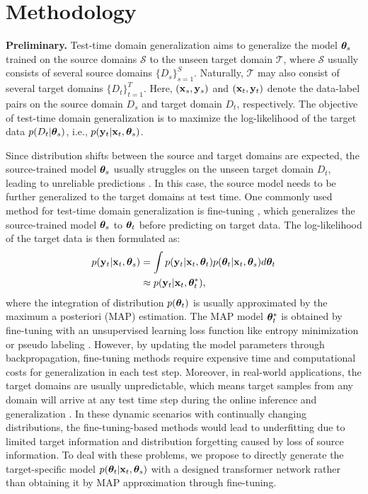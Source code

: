 
\section{Methodology}

\noindent
\textbf{Preliminary.} Test-time domain generalization aims to generalize the model $\boldsymbol{\theta}_{s}$ trained on the source domains $\mathcal{S}$ to the unseen target domain $\mathcal{T}$, where $\mathcal{S}$ usually consists of several source domains $\{ D_s \}_{s=1}^{S}$. Naturally, $\mathcal{T}$ may also consist of several target domains $\{ D_t \}_{t=1}^{T}$. Here, $(\mathbf{x}_s, \mathbf{y}_s)$ and $(\mathbf{x}_t, \mathbf{y}_t)$ denote the data-label pairs on the source domain $D_s$ and target domain $D_t$, respectively. The objective of test-time domain generalization is to maximize the log-likelihood of the target data $p(D_t|\boldsymbol{\theta}_s)$, i.e., $p(\mathbf{y}_t|\mathbf{x}_t, \boldsymbol{\theta}_s)$.

Since distribution shifts between the source and target domains are expected, the source-trained model $\boldsymbol{\theta}_s$ usually struggles on the unseen target domain $D_t$, leading to unreliable predictions \cite{dubey2021adaptive}. In this case, the source model needs to be further generalized to the target domains at test time. One commonly used method for test-time domain generalization is fine-tuning \cite{wang2021tent, jang2022test}, which generalizes the source-trained model $\boldsymbol{\theta}_s$ to $\boldsymbol{\theta}_t$ before predicting on target data. The log-likelihood of the target data is then formulated as:
\begin{equation}
\label{tta} %
\begin{aligned}
    p(\y_t|\x_t, \btheta_{s}) & = \int p(\y_t|\x_t, \btheta_{t}) p(\btheta_{t}|\x_t, \btheta_{s}) d \btheta_{t} \\ 
    & \approx p(\y_t|\x_t, \btheta^*_{t}),
\end{aligned}
\end{equation}
where the integration of distribution $p(\boldsymbol{\theta}_t)$ is usually approximated by the maximum a posteriori (MAP) estimation. The MAP model $\boldsymbol{\theta}^*_{t}$ is obtained by fine-tuning with an unsupervised learning loss function like entropy minimization \cite{wang2021tent} or pseudo labeling \cite{jang2022test}.
However, by updating the model parameters through backpropagation, fine-tuning methods require expensive time and computational costs for generalization in each test step. 
Moreover, in real-world applications, the target domains are usually unpredictable, which means target samples from any domain will arrive at any test time step during the online inference and generalization \cite{wang2022continual, yuan2023robust, niu2023towards}. In these dynamic scenarios with continually changing distributions, the fine-tuning-based methods would lead to underfitting  due to limited target information and distribution forgetting caused by loss of source information.
To deal with these problems, we propose to directly generate the target-specific model $p(\boldsymbol{\theta}_{t}|\mathbf{x}_t, \boldsymbol{\theta}_{s})$ with a designed transformer network rather than obtaining it by MAP approximation through fine-tuning. 




